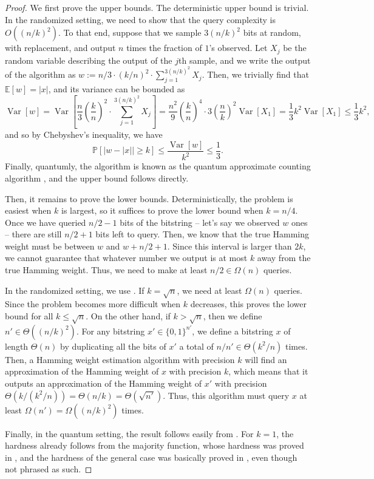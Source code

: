 \documentclass[11pt]{article}
\newcommand{\E}{\ensuremath{\mathbb{E}}}
\renewcommand{\P}{\ensuremath{\mathbb{P}}}
\DeclareMathOperator{\Var}{Var}
\begin{document}
    \begin{proof}
        We first prove the upper bounds. The deterministic upper bound is trivial. In the randomized setting, we need to show that the query complexity is $O((n/k)^2)$. To that end, suppose that we sample $3(n/k)^2$ bits at random, with replacement, and output $n$ times the fraction of $1$'s observed. Let $X_j$ be the random variable describing the output of the $j$th sample, and we write the output of the algorithm as $w := n/3 \cdot (k/n)^2 \cdot \sum_{j=1}^{3(n/k)^2} X_j$. Then, we trivially find that $\E[w] = |x|$, and its variance can be bounded as
        \[\Var[w] = \Var\left[\frac{n}{3}\left(\frac{k}{n}\right)^2 \cdot \sum_{j=1}^{3(n/k)^2} X_j\right] = \frac{n^2}{9}\left(\frac{k}{n}\right)^4 \cdot 3\left(\frac{n}{k}\right)^2 \Var[X_1] = \frac13k^2\Var[X_1] \leq \frac13k^2,\]
        and so by Chebyshev's inequality, we have
        \[\P[|w - |x|| \geq k] \leq \frac{\Var[w]}{k^2} \leq \frac13.\]
        Finally, quantumly, the algorithm is known as the quantum approximate counting algorithm \cite{BHMT98}, and the upper bound follows directly.

        Then, it remains to prove the lower bounds. Deterministically, the problem is easiest when $k$ is largest, so it suffices to prove the lower bound when $k = n/4$. Once we have queried $n/2-1$ bits of the bitstring -- let's say we observed $w$ ones -- there are still $n/2+1$ bits left to query. Then, we know that the true Hamming weight must be between $w$ and $w + n/2 + 1$. Since this interval is larger than $2k$, we cannot guarantee that whatever number we output is at most $k$ away from the true Hamming weight. Thus, we need to make at least $n/2 \in \Omega(n)$ queries.

        In the randomized setting, we use \cite[Lemma~26]{BDB20}. If $k = \sqrt{n}$, we need at least $\Omega(n)$ queries. Since the problem becomes more difficult when $k$ decreases, this proves the lower bound for all $k \leq \sqrt{n}$. On the other hand, if $k > \sqrt{n}$, then we define $n' \in \Theta((n/k)^2)$. For any bitstring $x' \in \{0,1\}^{n'}$, we define a bitstring $x$ of length $\Theta(n)$ by duplicating all the bits of $x'$ a total of $n/n' \in \Theta(k^2/n)$ times. Then, a Hamming weight estimation algorithm with precision $k$ will find an approximation of the Hamming weight of $x$ with precision $k$, which means that it outputs an approximation of the Hamming weight of $x'$ with precision $\Theta(k/(k^2/n)) = \Theta(n/k) = \Theta(\sqrt{n'})$. Thus, this algorithm must query $x$ at least $\Omega(n') = \Omega((n/k)^2)$ times.

        Finally, in the quantum setting, the result follows easily from \cite{Amb00}. For $k = 1$, the hardness already follows from the majority function, whose hardness was proved in \cite{BBC+01}, and the hardness of the general case was basically proved in \cite{NW99}, even though not phrased as such.
    \end{proof}
\end{document}
